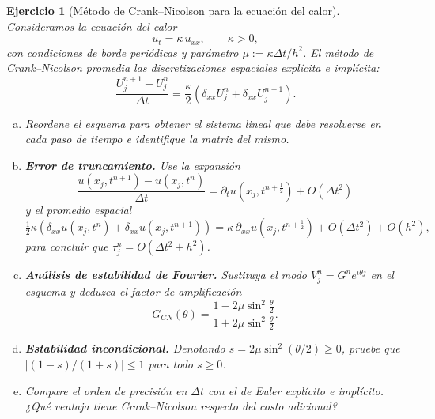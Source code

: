 \documentclass[12pt]{article}
\newtheorem{exercise}{Ejercicio}
\def\dt{\Delta t}
\begin{document}
\begin{exercise}[Método de Crank--Nicolson para la ecuación del calor]
Consideramos la ecuación del calor
\[
  u_t = \kappa\,u_{xx},\qquad \kappa>0,
\]
con condiciones de borde periódicas y parámetro $\mu:=\kappa\dt/h^2$.
El método de Crank--Nicolson promedia las discretizaciones espaciales explícita e implícita:
\[
  \frac{U_j^{n+1}-U_j^n}{\dt} = \frac{\kappa}{2}\left(\delta_{xx}U_j^n + \delta_{xx}U_j^{n+1}\right).
\]
\begin{enumerate}[(a)]
\item Reordene el esquema para obtener el sistema lineal que debe resolverse en cada paso de tiempo e identifique la matriz del mismo.

\item \textbf{Error de truncamiento.} Use la expansión
\[
  \frac{u(x_j,t^{n+1})-u(x_j,t^n)}{\dt} = \partial_t u\!\left(x_j,t^{n+\frac{1}{2}}\right) + O(\dt^2)
\]
y el promedio espacial
\[
  \tfrac{1}{2}\kappa\!\left(\delta_{xx}u(x_j,t^n)+\delta_{xx}u(x_j,t^{n+1})\right)
  = \kappa\,\partial_{xx}u\!\left(x_j,t^{n+\frac{1}{2}}\right) + O(\dt^2) + O(h^2),
\]
para concluir que $\tau_j^n = O(\dt^2 + h^2)$.

\item \textbf{Análisis de estabilidad de Fourier.} Sustituya el modo $V_j^n = G^n e^{i\theta j}$ en el esquema y deduzca el factor de amplificación
\[
  G_{CN}(\theta) = \frac{1-2\mu\sin^2\!\tfrac{\theta}{2}}{1+2\mu\sin^2\!\tfrac{\theta}{2}}.
\]

\item \textbf{Estabilidad incondicional.} Denotando $s = 2\mu\sin^2(\theta/2) \ge 0$, pruebe que $|{(1-s)}/{(1+s)}|\le 1$ para todo $s\ge 0$.

\item Compare el orden de precisión en $\dt$ con el de Euler explícito e implícito. ¿Qué ventaja tiene Crank--Nicolson respecto del costo adicional?
\end{enumerate}
\end{exercise}
\end{document}
